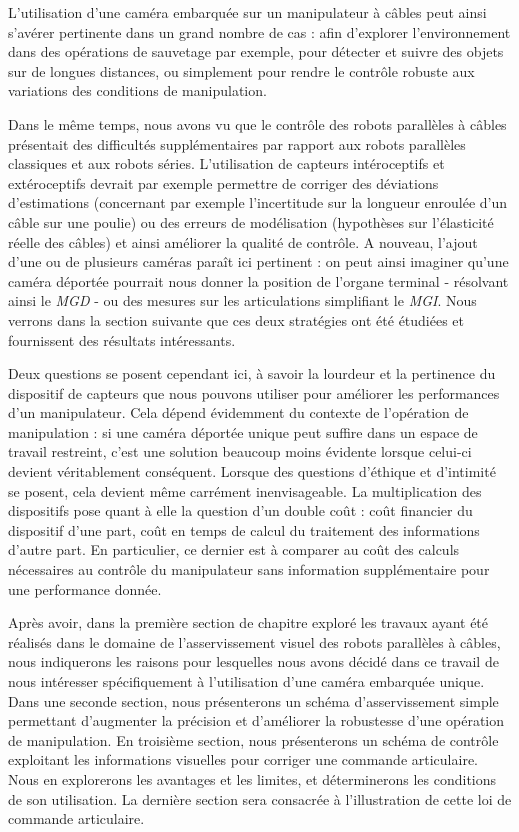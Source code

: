 L'utilisation d'une cam\'era embarqu\'ee sur un manipulateur \`a c\^ables peut ainsi
s'av\'erer pertinente dans un grand nombre de cas : afin d'explorer 
l'environnement dans des op\'erations de sauvetage par exemple, pour d\'etecter 
et suivre des objets sur de longues distances, ou simplement pour rendre le 
contr\^ole robuste aux variations des conditions de manipulation.

Dans le m\^eme temps, nous avons vu que le contr\^ole des robots parall\`eles 
\`a c\^ables pr\'esentait des difficult\'es suppl\'ementaires par rapport aux 
robots parall\`eles classiques et aux robots s\'eries. L'utilisation de 
capteurs int\'eroceptifs et ext\'eroceptifs devrait par exemple permettre de 
corriger des d\'eviations d'estimations (concernant par exemple l'incertitude 
sur la longueur enroul\'ee d'un c\^able sur une poulie) ou des erreurs de 
mod\'elisation (hypoth\`eses sur l'\'elasticit\'e r\'eelle des c\^ables) et 
ainsi am\'eliorer la qualit\'e de contr\^ole. A nouveau, l'ajout d'une ou de 
plusieurs cam\'eras para\^it ici pertinent : on peut ainsi imaginer qu'une 
cam\'era d\'eport\'ee pourrait nous donner la position de l'organe terminal - 
r\'esolvant ainsi le {\it MGD} - ou des mesures sur les articulations 
simplifiant le {\it MGI}. Nous verrons dans la section suivante que ces deux 
strat\'egies ont \'et\'e \'etudi\'ees et fournissent des r\'esultats 
int\'eressants.

Deux questions se posent cependant ici, \`a savoir la lourdeur et la pertinence 
du dispositif de capteurs que nous pouvons utiliser pour am\'eliorer les 
performances d'un manipulateur. Cela d\'epend \'evidemment du contexte de 
l'op\'eration de manipulation : si une cam\'era d\'eport\'ee unique peut 
suffire dans un espace de travail restreint, c'est une solution beaucoup moins 
\'evidente lorsque celui-ci devient v\'eritablement cons\'equent. Lorsque des 
questions d'\'ethique et d'intimit\'e se posent, cela devient m\^eme 
carr\'ement inenvisageable. La multiplication des dispositifs pose quant \`a 
elle la question d'un double co\^ut : co\^ut financier du dispositif d'une part, co\^ut en 
temps de calcul du traitement des informations d'autre part. En particulier, ce dernier est 
\`a comparer au co\^ut des calculs n\'ecessaires au contr\^ole du manipulateur 
sans information suppl\'ementaire pour une performance donn\'ee.

Apr\`es avoir, dans la premi\`ere section de chapitre explor\'e les travaux 
ayant \'et\'e r\'ealis\'es dans le domaine de l'asservissement visuel des 
robots parall\`eles \`a c\^ables, nous indiquerons les raisons pour lesquelles 
nous avons d\'ecid\'e dans ce travail de nous int\'eresser sp\'ecifiquement \`a 
l'utilisation d'une cam\'era embarqu\'ee unique. Dans une seconde section, nous 
pr\'esenterons un sch\'ema d'asservissement simple permettant d'augmenter la 
pr\'ecision et d'am\'eliorer la robustesse d'une op\'eration de manipulation. En 
troisi\`eme section, nous pr\'esenterons un sch\'ema de contr\^ole exploitant 
les informations visuelles pour corriger une commande articulaire. Nous en 
explorerons les avantages et les limites, et d\'eterminerons les conditions de 
son utilisation. La derni\`ere section sera consacr\'ee \`a l'illustration de 
cette loi de commande articulaire.

